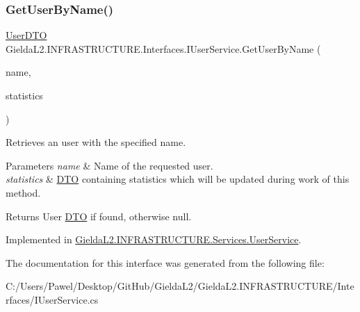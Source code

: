 \mbox{\label{interface_gielda_l2_1_1_i_n_f_r_a_s_t_r_u_c_t_u_r_e_1_1_interfaces_1_1_i_user_service_a438bd5d0424677c7797ce1ec00d132dc}} 
\subsubsection{\texorpdfstring{GetUserByName()}{GetUserByName()}}
{\footnotesize\ttfamily \mbox{\hyperlink{class_gielda_l2_1_1_i_n_f_r_a_s_t_r_u_c_t_u_r_e_1_1_d_t_o_1_1_user_d_t_o}{User\+D\+TO}} Gielda\+L2.\+I\+N\+F\+R\+A\+S\+T\+R\+U\+C\+T\+U\+R\+E.\+Interfaces.\+I\+User\+Service.\+Get\+User\+By\+Name (\begin{DoxyParamCaption}\item[{string}]{name,  }\item[{\mbox{\hyperlink{class_gielda_l2_1_1_i_n_f_r_a_s_t_r_u_c_t_u_r_e_1_1_d_t_o_1_1_statistics_d_t_o}{Statistics\+D\+TO}}}]{statistics }\end{DoxyParamCaption})}



Retrieves an user with the specified name. 


\begin{DoxyParams}{Parameters}
{\em name} & Name of the requested user.\\
\hline
{\em statistics} & \mbox{\hyperlink{namespace_gielda_l2_1_1_i_n_f_r_a_s_t_r_u_c_t_u_r_e_1_1_d_t_o}{D\+TO}} containing statistics which will be updated during work of this method.\\
\hline
\end{DoxyParams}
\begin{DoxyReturn}{Returns}
User \mbox{\hyperlink{namespace_gielda_l2_1_1_i_n_f_r_a_s_t_r_u_c_t_u_r_e_1_1_d_t_o}{D\+TO}} if found, otherwise null.
\end{DoxyReturn}


Implemented in \mbox{\hyperlink{class_gielda_l2_1_1_i_n_f_r_a_s_t_r_u_c_t_u_r_e_1_1_services_1_1_user_service_aea2901aafb86692c9aa8efa24b8801ee}{Gielda\+L2.\+I\+N\+F\+R\+A\+S\+T\+R\+U\+C\+T\+U\+R\+E.\+Services.\+User\+Service}}.



The documentation for this interface was generated from the following file\+:\begin{DoxyCompactItemize}
\item 
C\+:/\+Users/\+Pawel/\+Desktop/\+Git\+Hub/\+Gielda\+L2/\+Gielda\+L2.\+I\+N\+F\+R\+A\+S\+T\+R\+U\+C\+T\+U\+R\+E/\+Interfaces/I\+User\+Service.\+cs\end{DoxyCompactItemize}

